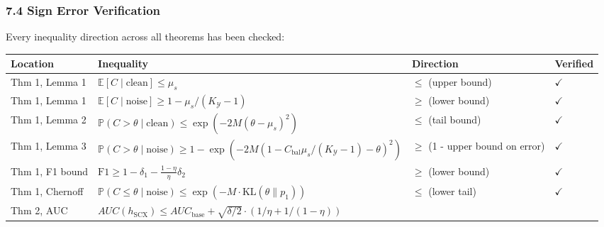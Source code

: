 \documentclass[
  12pt,
]{ctexart}
\begin{document}
\subsubsection{7.4 Sign Error
Verification}\label{sign-error-verification}

Every inequality direction across all theorems has been checked:

\begin{longtable}[]{@{}
  >{\raggedright\arraybackslash}p{}
  >{\raggedright\arraybackslash}p{}
  >{\raggedright\arraybackslash}p{}
  >{\raggedright\arraybackslash}p{}@{}}
\toprule\noalign{}
\begin{minipage}[b]{\linewidth}\raggedright
Location
\end{minipage} & \begin{minipage}[b]{\linewidth}\raggedright
Inequality
\end{minipage} & \begin{minipage}[b]{\linewidth}\raggedright
Direction
\end{minipage} & \begin{minipage}[b]{\linewidth}\raggedright
Verified
\end{minipage} \\
\midrule\noalign{}
\endhead
\bottomrule\noalign{}
\endlastfoot
Thm 1, Lemma 1 & \(\mathbb{E}[C \mid \text{clean}] \leq \mu_s\) &
\(\leq\) (upper bound) & \(\checkmark\) \\
Thm 1, Lemma 1 &
\(\mathbb{E}[C \mid \text{noise}] \geq 1 - \mu_s/(K_{\mathcal{Y}}-1)\) &
\(\geq\) (lower bound) & \(\checkmark\) \\
Thm 1, Lemma 2 &
\(\mathbb{P}(C > \theta \mid \text{clean}) \leq \exp(-2M(\theta-\mu_s)^2)\)
& \(\leq\) (tail bound) & \(\checkmark\) \\
Thm 1, Lemma 3 &
\(\mathbb{P}(C > \theta \mid \text{noise}) \geq 1 - \exp(-2M(1 - C_{\text{bal}}\mu_s/(K_{\mathcal{Y}}-1) - \theta)^2)\)
& \(\geq\) (1 - upper bound on error) & \(\checkmark\) \\
Thm 1, F1 bound &
\(\text{F1} \geq 1 - \delta_1 - \frac{1-\eta}{\eta}\delta_2\) & \(\geq\)
(lower bound) & \(\checkmark\) \\
Thm 1, Chernoff &
\(\mathbb{P}(C \leq \theta \mid \text{noise}) \leq \exp(-M \cdot \text{KL}(\theta \| p_1))\)
& \(\leq\) (lower tail) & \(\checkmark\) \\
Thm 2, AUC &
\(AUC(h_{\text{SCX}}) \leq AUC_{\text{base}} + \sqrt{\delta/2} \cdot (1/\eta + 1/(1-\eta))\)

\end{longtable}
\end{document}
